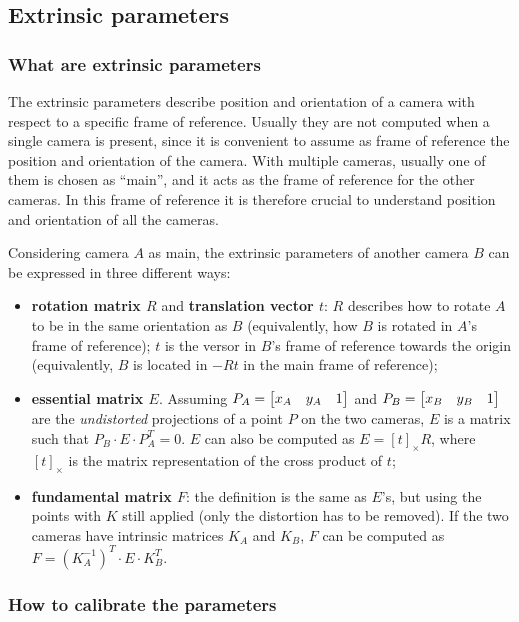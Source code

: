 \subsection{Extrinsic parameters}

\subsubsection{What are extrinsic parameters}

The extrinsic parameters describe position and orientation of a camera with respect to a specific frame of reference.
Usually they are not computed when a single camera is present, since it is convenient to assume as frame of reference the position and orientation of the camera.
With multiple cameras, usually one of them is chosen as ``main'', and it acts as the frame of reference for the other cameras.
In this frame of reference it is therefore crucial to understand position and orientation of all the cameras.

Considering camera $A$ as main, the extrinsic parameters of another camera $B$ can be expressed in three different ways:
\begin{itemize}
	\item \textbf{rotation matrix $R$} and \textbf{translation vector $t$}: $R$ describes how to rotate $A$ to be in the same orientation as $B$ (equivalently, how $B$ is rotated in $A$'s frame of reference); $t$ is the versor in $B$'s frame of reference towards the origin (equivalently, $B$ is located in $-Rt$ in the main frame of reference);
	\item \textbf{essential matrix $E$}. Assuming $P_A=\begin{bmatrix} x_A & y_A & 1 \end{bmatrix}$ and $P_B=\begin{bmatrix} x_B & y_B & 1 \end{bmatrix}$ are the \textit{undistorted} projections of a point $P$ on the two cameras, $E$ is a matrix such that $P_B \cdot E \cdot P_A^T = 0$. $E$ can also be computed as $E = [t]_{\times}R$, where $[t]_{\times}$ is the matrix representation of the cross product of $t$;
	\item \textbf{fundamental matrix $F$}: the definition is the same as $E$'s, but using the points with $K$ still applied (only the distortion has to be removed). If the two cameras have intrinsic matrices $K_A$ and $K_B$, $F$ can be computed as $F = \left(K_A^{-1}\right)^T \cdot E \cdot K_B^T$.
\end{itemize}

\subsubsection{How to calibrate the parameters}

